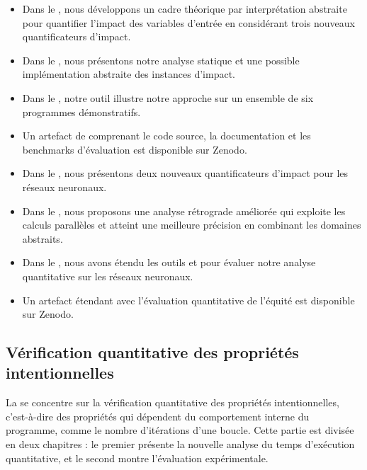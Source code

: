 {\begin{itemize}
  \item Dans le , nous développons un cadre théorique par interprétation abstraite pour quantifier l'impact des variables d'entrée en considérant trois nouveaux quantificateurs d'impact.
  \item Dans le , nous présentons notre analyse statique et une possible implémentation abstraite des instances d'impact.
  \item Dans le , notre outil \impatto{} illustre notre approche sur un ensemble de six programmes démonstratifs.
  \item Un artefact de \impatto{} comprenant le code source, la documentation et les benchmarks d'évaluation est disponible sur Zenodo\sidenote{\impattozenodo}.
  \item Dans le , nous présentons deux nouveaux quantificateurs d'impact pour les réseaux neuronaux.
  \item Dans le , nous proposons une analyse rétrograde améliorée qui exploite les calculs parallèles et atteint une meilleure précision en combinant les domaines abstraits.
  \item Dans le , nous avons étendu les outils \impatto{} et \libra\sidenote{\libraurl} pour évaluer notre analyse quantitative sur les réseaux neuronaux.
  \item Un artefact étendant \libra{} avec l'évaluation quantitative de l'équité est disponible sur Zenodo\sidenote{\librazenodo}.
\end{itemize}

\subsection*{Vérification quantitative des propriétés intentionnelles}


La  se concentre sur la vérification quantitative des propriétés intentionnelles, c'est-à-dire des propriétés qui dépendent du comportement interne du programme, comme le nombre d'itérations d'une boucle. Cette partie est divisée en deux chapitres : le premier présente la nouvelle analyse du temps d'exécution quantitative, et le second montre l'évaluation expérimentale.

}
